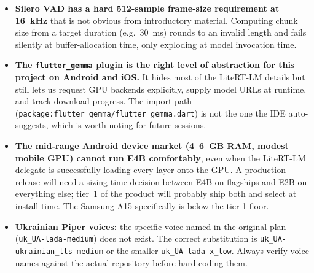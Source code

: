 \documentclass{article}
\theoremstyle{plain}
\theoremstyle{definition}
\theoremstyle{remark}
\begin{document}
\begin{itemize}
\item \textbf{Silero VAD has a hard 512-sample frame-size requirement at 16~kHz} that is not obvious from introductory material. Computing chunk size from a target duration (e.g.\ 30~ms) rounds to an invalid length and fails silently at buffer-allocation time, only exploding at model invocation time.
\item \textbf{The \texttt{flutter\_gemma} plugin is the right level of abstraction for this project on Android and iOS.} It hides most of the LiteRT-LM details but still lets us request GPU backends explicitly, supply model URLs at runtime, and track download progress. The import path (\texttt{package:flutter\_gemma/flutter\_gemma.dart}) is not the one the IDE auto-suggests, which is worth noting for future sessions.
\item \textbf{The mid-range Android device market (4--6~GB RAM, modest mobile GPU) cannot run E4B comfortably}, even when the LiteRT-LM delegate is successfully loading every layer onto the GPU. A production release will need a sizing-time decision between E4B on flagships and E2B on everything else; tier~1 of the product will probably ship both and select at install time. The Samsung A15 specifically is below the tier-1 floor.
\item \textbf{Ukrainian Piper voices:} the specific voice named in the original plan (\texttt{uk\_UA-lada-medium}) does not exist. The correct substitution is \texttt{uk\_UA-ukrainian\_tts-medium} or the smaller \texttt{uk\_UA-lada-x\_low}. Always verify voice names against the actual repository before hard-coding them.
\end{itemize}
\end{document}
